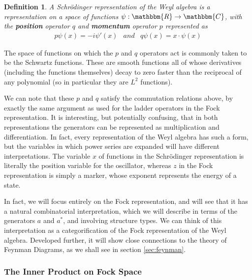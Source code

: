 \documentclass{amsart} \usepackage{amsmath,amssymb,bbm}
\newtheorem{definition}{Definition}
\begin{document}
\begin{definition}
  A Schr\"odinger representation of the Weyl algebra is a
  representation on a space of functions $\psi : \mathbbm{R}
  \rightarrow \mathbbm{C}$, with the {\textbf{position}} operator $q$
  and {\textbf{momentum}} operator $p$ represented as \begin{equation}
   \begin{array}{lll}
    p \psi ( x ) = - i \psi' ( x ) &
    and &
    q \psi ( x ) = x \cdot \psi ( x )
   \end{array}
  \end{equation}
\end{definition}

The space of functions on which the $p$ and $q$ operators act is
commonly taken to be the Schwartz functions.  These are smooth
functions all of whose derivatives (including the functions
themselves) decay to zero faster than the reciprocal of any polynomial
(so in particular they are $L^2$ functions).

We can note that these $p$ and $q$ satisfy the commutation relations
above, by exactly the same argument as used for the ladder operators
in the Fock representation.  It is interesting, but potentially
confusing, that in both representations the generators can be
represented as multiplication and differentiation.  In fact, every
representation of the Weyl algebra has such a form, but the variables
in which power series are expanded will have different
interpretations.  The variable $x$ of functions in the Schr\"odinger
representation is literally the position variable for the oscillator,
whereas $z$ in the Fock representation is simply a marker, whose
exponent represents the energy of a state.

In fact, we will focus entirely on the Fock representation, and will
see that it has a natural combinatorial interpretation, which we will
describe in terms of the generators $a$ and $a^{\ast}$, and involving
structure types.  We can think of this interpretation as a
categorification of the Fock representation of the Weyl algebra.
Developed further, it will show close connections to the theory of
Feynman Diagrams, as we shall see in section \ref{sec:feynman}.

\subsubsection{The Inner Product on Fock Space} \label{fockinnerprod}
\end{document}
